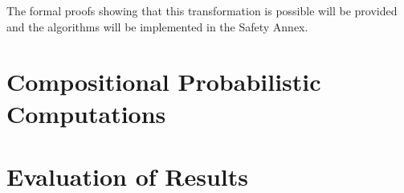 

The formal proofs showing that this transformation is possible will be provided and the algorithms will be implemented in the Safety Annex.  


\section{Compositional Probabilistic Computations}

\section{Evaluation of Results}














